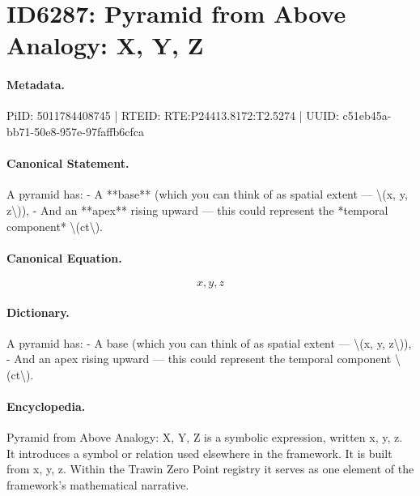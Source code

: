 \section*{ID6287: Pyramid from Above Analogy: X, Y, Z}
\paragraph{Metadata.}
PiID: 5011784408745 | RTEID: RTE:P24413.8172:T2.5274 | UUID: c51eb45a-bb71-50e8-957e-97faffb6cfca

\paragraph{Canonical Statement.}
A pyramid has: - A **base** (which you can think of as spatial extent — \textbackslash{}(x, y, z\textbackslash{})), - And an **apex** rising upward — this could represent the *temporal component* \textbackslash{}(ct\textbackslash{}).

\paragraph{Canonical Equation.}
\[
x, y, z
\]

\paragraph{Dictionary.}
A pyramid has: - A base (which you can think of as spatial extent — \textbackslash{}(x, y, z\textbackslash{})), - And an apex rising upward — this could represent the temporal component \textbackslash{}(ct\textbackslash{}).

\paragraph{Encyclopedia.}
Pyramid from Above Analogy: X, Y, Z is a symbolic expression, written x, y, z. It introduces a symbol or relation used elsewhere in the framework. It is built from x, y, z. Within the Trawin Zero Point registry it serves as one element of the framework's mathematical narrative.

